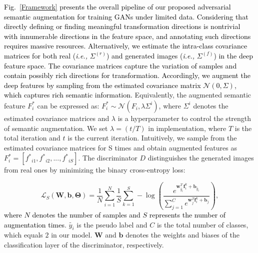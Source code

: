 \documentclass[10pt,journal,compsoc]{IEEEtran}
\newcommand{\revise}[1]{\textcolor{black}{#1}}
\begin{document}
\revise{Fig.~\ref{Framework} presents the overall pipeline of our proposed adversarial semantic augmentation for training GANs under limited data}.
%
\revise{Considering that directly defining or finding meaningful transformation directions is nontrivial with innumerable directions in the feature space, and annotating such directions requires massive resources.
%
Alternatively, we estimate the intra-class covariance matrices for both real (\emph{i.e.,} $\Sigma^{(r)}$)  and generated images (\emph{i.e.,} $\Sigma^{(f)}$) in the deep feature space.
The covariance matrices capture the variation of samples and contain possibly rich directions for transformation.
Accordingly, we augment the deep features by sampling from the estimated covariance matrix $\mathcal{N}\left(0, \Sigma\right)$, which captures rich semantic information.}
Equivalently, the augmented semantic feature $F^{*}_{i}$ can be expressed as: $F^{*}_{i} \sim \mathcal{N}\left(F_{i}, \lambda \Sigma^{{i}}\right)$, where $\Sigma^{{i}}$ denotes the estimated covariance matrices and $\lambda$ is a hyperparameter to control the strength of semantic augmentation.
We set $\lambda=(t / T)$ in implementation, where $T$ is the total iteration and $t$ is the current iteration.
Intuitively, we sample from the estimated covariance matrices for S times and obtain augmented features as ${F^{*}_{i}=[{f^{*}}_{i1},{f^{*}}_{i2},...,{f^{*}}_{iS}]}$.
The discriminator $D$ distinguishes the generated images from real ones by minimizing the binary cross-entropy loss:


\begin{equation}
\mathcal{L}_{S}(\boldsymbol{W}, \boldsymbol{b}, \boldsymbol{\Theta})=\frac{1}{N} \sum_{i=1}^{N} \frac{1}{S} \sum_{k=1}^{S}-\log \left(\frac{e^{\boldsymbol{w}_{\tilde{y_{i}}}^{T} \boldsymbol{f}_{i}^{k}+\boldsymbol{b}_{\tilde{y_{i}}}}}{\sum_{j=1}^{C} e^{\boldsymbol{w}_{j}^{T} \boldsymbol{f}_{i}^{k}+\boldsymbol{b}_{j}}}\right),
\end{equation}
%
\revise{where $N$ denotes the number of samples and $S$ represents the number of augmentation times}. 
$\tilde{y_{i}}$ is the pseudo label and $C$ is the total number of classes, which equals $2$ in our model.
$\boldsymbol{W}$ and $\boldsymbol{b}$ denotes the weights and biases of the classification layer of the discriminator, respectively.
\end{document}

